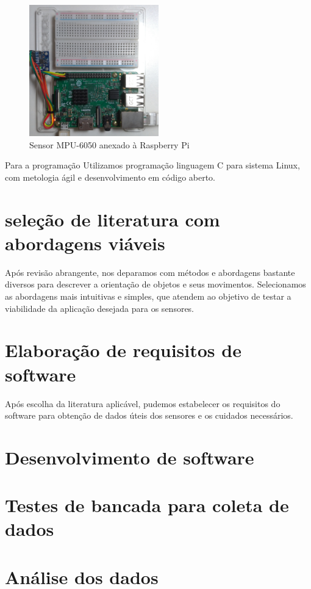 \begin{figure}[H]
    \centering
    \caption{Sensor MPU-6050 anexado à Raspberry Pi}\label{fig:mpu6050-proto-top}
    \includegraphics[width=0.5\textwidth]{figuras/mpu6050-proto-top.jpg}
\end{figure}

Para a programação Utilizamos programação linguagem C para sistema Linux, com metologia ágil e desenvolvimento em código aberto.

\section{seleção de literatura com abordagens viáveis}

Após revisão abrangente, nos deparamos com métodos e abordagens bastante diversos para descrever a orientação de objetos e seus movimentos. Selecionamos as abordagens mais intuitivas e simples, que atendem ao objetivo de testar a viabilidade da aplicação desejada para os sensores.

\section{Elaboração de requisitos de software}

Após escolha da literatura aplicável, pudemos estabelecer os requisitos do software para obtenção de dados úteis dos sensores e os cuidados necessários.

\section{Desenvolvimento de software}

\section{ Testes de bancada para coleta de dados}

\section{ Análise dos dados}
